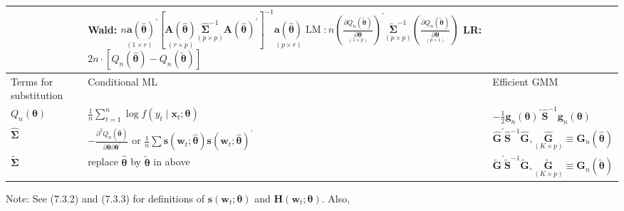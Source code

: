 \documentclass[10pt]{article}
\begin{document}
\begin{center}
\begin{tabular}{|l|l|l|}
\hline
 & Wald: $\underset{(1 \times r)}{n \mathbf{a}(\hat{\boldsymbol{\theta}})^{\prime}}\left[\underset{(r \times p)}{\mathbf{A}(\hat{\boldsymbol{\theta}})} \underset{(p \times p)}{\widehat{\boldsymbol{\Sigma}}^{-1}} \mathbf{A}(\hat{\boldsymbol{\theta}})^{\prime}\right]^{-1} \underset{(p \times r)}{\mathbf{a}(\hat{\boldsymbol{\theta}})} \operatorname{LM}: n\left(\frac{\partial Q_{n}(\tilde{\boldsymbol{\theta}})}{\underset{(1 \times p)}{\partial \boldsymbol{\theta}}}\right)^{\prime} \underset{(p \times p)}{\widetilde{\boldsymbol{\Sigma}}^{-1}}\left(\frac{\partial Q_{n}(\tilde{\boldsymbol{\theta}})}{\underset{(p \times 1)}{\partial \boldsymbol{\theta}}}\right)$ LR: $2 n \cdot\left[Q_{n}(\hat{\boldsymbol{\theta}})-Q_{n}(\tilde{\boldsymbol{\theta}})\right]$ &  \\
\hline
Terms for substitution & Conditional ML & Efficient GMM \\
\hline
$Q_{n}(\boldsymbol{\theta})$ & $\frac{1}{n} \sum_{t=1}^{n} \log f\left(y_{t} \mid \mathbf{x}_{t} ; \boldsymbol{\theta}\right)$ & $-\frac{1}{2} \mathbf{g}_{n}(\boldsymbol{\theta})^{\prime} \widehat{\mathbf{S}}^{-1} \mathbf{g}_{n}(\boldsymbol{\theta})$ \\
\hline
$\widehat{\mathbf{\Sigma}}$ & $-\frac{\partial^{2} Q_{n}(\hat{\boldsymbol{\theta}})}{\partial \boldsymbol{\theta} \partial \boldsymbol{\theta}^{\prime}}$ or $\frac{1}{n} \sum \mathbf{s}\left(\mathbf{w}_{t} ; \hat{\boldsymbol{\theta}}\right) \mathbf{s}\left(\mathbf{w}_{t} ; \hat{\boldsymbol{\theta}}\right)^{\prime}$ & $\widehat{\mathbf{G}}^{\prime} \widehat{\mathbf{S}}^{-1} \widehat{\mathbf{G}}, \underset{(K \times p)}{\widehat{\mathbf{G}}} \equiv \mathbf{G}_{n}(\hat{\boldsymbol{\theta}})$ \\
\hline
$\widetilde{\mathbf{\Sigma}}$ & replace $\hat{\boldsymbol{\theta}}$ by $\tilde{\boldsymbol{\theta}}$ in above & $\widetilde{\mathbf{G}}^{\prime} \widetilde{\mathbf{S}}^{-1} \widetilde{\mathbf{G}}, \underset{(K \times p)}{\widetilde{\mathbf{G}}} \equiv \mathbf{G}_{n}(\tilde{\boldsymbol{\theta}})$ \\
\hline
\end{tabular}
\end{center}

Note: See (7.3.2) and (7.3.3) for definitions of $\mathbf{s}\left(\mathbf{w}_{t} ; \boldsymbol{\theta}\right)$ and $\mathbf{H}\left(\mathbf{w}_{t} ; \boldsymbol{\theta}\right)$. Also,
\end{document}
